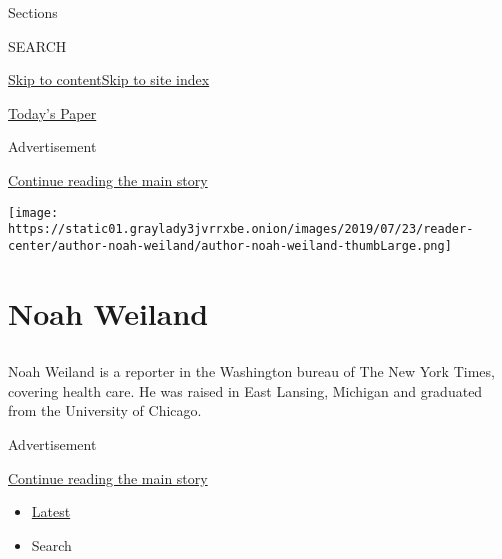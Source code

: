 Sections

SEARCH

\protect\hyperlink{site-content}{Skip to
content}\protect\hyperlink{site-index}{Skip to site index}

\href{https://myaccount.nytimes3xbfgragh.onion/auth/login?response_type=cookie\&client_id=vi}{}

\href{https://www.nytimes3xbfgragh.onion/section/todayspaper}{Today's
Paper}

Advertisement

\protect\hyperlink{after-top}{Continue reading the main story}

\texttt{[image: https://static01.graylady3jvrrxbe.onion/images/2019/07/23/reader-center/author-noah-weiland/author-noah-weiland-thumbLarge.png]}

\hypertarget{noah-weiland}{%
\section{Noah Weiland}\label{noah-weiland}}

\subsection{}

Noah Weiland is a reporter in the Washington bureau of The New York
Times, covering health care. He was raised in East Lansing, Michigan and
graduated from the University of Chicago.

Advertisement

\protect\hyperlink{after-mid1}{Continue reading the main story}

\begin{itemize}
\tightlist
\item
  \protect\hyperlink{stream-panel}{Latest}
\item
  Search
\end{itemize}

